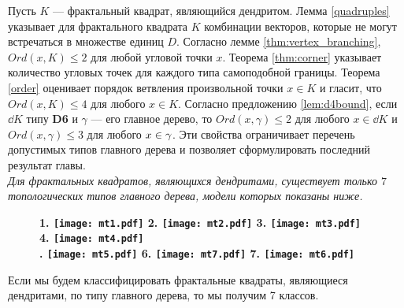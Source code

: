 Пусть $K$ --- фрактальный квадрат, являющийся дендритом.
Лемма \ref{quadruples} указывает для фрактального квадрата $K$ комбинации векторов, которые не могут встречаться в множестве единиц $D$.
Согласно лемме \ref{thm:vertex_branching}, $Ord(x,K)\leq 2$ для любой угловой точки $x$.
Теорема \ref{thm:corner} указывает количество угловых точек для каждого типа самоподобной границы.
Теорема \ref{order} оценивает порядок ветвления произвольной точки $x\in K$ и гласит, что $Ord(x,K)\leq 4$ для любого $x\in K$.
Согласно предложению \ref{lem:d4bound}, если $\dd K$ типу {\bf D6} и $\gamma$ --- его главное дерево, то $Ord(x,\gamma)\leq2$ для любого $x\in\dd K$ и $Ord(x,\gamma)\leq3$ для любого $x\in\gamma$.
Эти свойства ограничивает перечень допустимых типов главного дерева и позволяет сформулировать последний результат главы.\\

{\em Для фрактальных квадратов, являющихся дендритами, существует только $7$ топологических типов главного дерева, модели которых показаны ниже.}
\begin{figure}[H]
    \centering \Large {\bf
    1. \texttt{[image: mt1.pdf]}
    \hfill
    2. \texttt{[image: mt2.pdf]}
    \hfill
    3. \texttt{[image: mt3.pdf]}
    \hfill
    4. \texttt{[image: mt4.pdf]}\\
    . \texttt{[image: mt5.pdf]}
    \hfill
    6. \texttt{[image: mt7.pdf]}
    \hfill
    7. \texttt{[image: mt6.pdf]}}
\end{figure}

Если мы будем классифицировать фрактальные квадраты, являющиеся дендритами, по типу главного дерева, то мы получим 7 классов.




